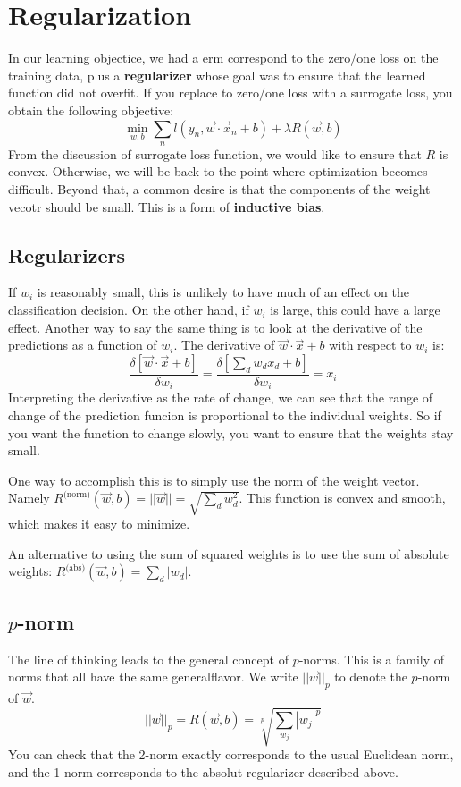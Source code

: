 \chapter{Regularization}
In our learning objectice, we had a erm correspond to the zero/one loss on the training data, plus a \textbf{regularizer} whose goal was to ensure that the learned function did not overfit. If you replace to zero/one loss with a surrogate loss, you obtain the following objective:
\begin{equation}
    \min_{w,b} \sum_n l(y_n, \vec{w} \cdot \vec{x}_n + b) + \lambda R(\vec{w},b)
\end{equation}
From the discussion of surrogate loss function, we would like to ensure that \(R\) is convex. Otherwise, we will be back to the point where optimization becomes difficult. Beyond that, a common desire is that the components of the weight vecotr should be small. This is a form of \textbf{inductive bias}.

\section{Regularizers}

If \(w_i\) is reasonably small, this is unlikely to have much of an effect on the classification decision. On the other hand, if \(w_i\) is large, this could have a large effect. 
Another way to say the same thing is to look at the derivative of the predictions as a function of \(w_i\). The derivative of \(\vec{w} \cdot \vec{x} + b\) with respect to \(w_i\) is:
\begin{equation}
    \frac {\delta [\vec{w} \cdot \vec{x} + b]} {\delta w_i} = \frac {\delta [\sum_d w_d x_d + b]} {\delta w_i} = x_i
\end{equation}
Interpreting the derivative as the rate of change, we can see that the range of change of the prediction funcion is proportional to the individual weights. So if you want the function to change slowly, you want to ensure that the weights stay small.

One way to accomplish this is to simply use the norm of the weight vector. Namely \(R^\text{(norm)}(\vec{w},b) = ||\vec{w}|| = \sqrt{\sum_d w_d^2}\). This function is convex and smooth, which makes it easy to minimize.

An alternative to using the sum of squared weights is to use the sum of absolute weights: \(R^\text{(abs)}(\vec{w},b) = \sum_d |w_d|\).

\section{\(p\)-norm}
The line of thinking leads to the general concept of \(p\)-norms. This is a family of norms that all have the same generalflavor. We write \(||\vec{w}||_p\) to denote the \(p\)-norm of \(\vec{w}\).
\begin{equation}
    ||\vec{w}||_p = R(\vec{w},b) = \sqrt[p]{\sum_{w_j} |w_j|^p}
\end{equation}
You can check that the 2-norm exactly corresponds to the usual Euclidean norm, and the 1-norm corresponds to the absolut regularizer described above.

